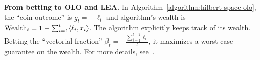 \textbf{From betting to \ac{OLO} and \ac{LEA}.}
In Algorithm~\ref{algorithm:hilbert-space-olo}, the ``coin outcome'' is
$g_t = -\ell_t$ and algorithm's wealth is $\operatorname{Wealth}_t = 1 - \sum_{i=1}^t \langle \ell_i, x_i \rangle$.
The algorithm explicitly keeps track of its wealth. Betting the ``vectorial fraction''
$\beta_t = - \tfrac{\sum_{i=1}^{t-1} \ell_i}{t}$, it maximizes a worst case guarantee on the wealth.
For more details, see~\cite{Orabona-Pal-2016-parameter-free}.
